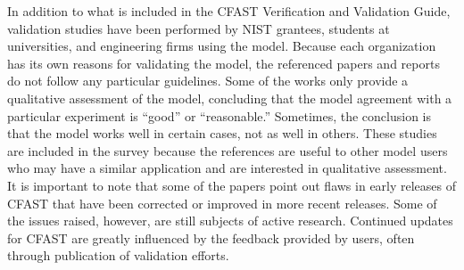 In addition to what is included in the CFAST Verification and Validation Guide, validation studies have been performed by NIST grantees, students at universities, and engineering firms using the model.  Because each organization has its  own reasons for  validating the model, the  referenced papers and reports do not follow any particular guidelines. Some of the works only provide  a qualitative assessment  of the model,  concluding that the  model  agreement with  a  particular  experiment  is ``good''  or ``reasonable.'' Sometimes, the conclusion is that the model works well in certain cases, not as well in others. These studies are included in the survey because the references  are useful to other model users who may have a similar application  and are interested in qualitative assessment. It is important to note  that some of the papers point out flaws in early releases of CFAST that have been corrected or improved in more recent  releases. Some of  the issues raised, however,  are still subjects of  active research. Continued updates for CFAST  are greatly influenced by the feedback provided by users, often through publication of validation efforts.
